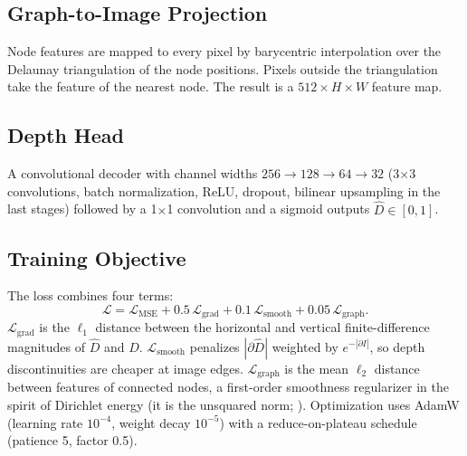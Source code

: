 \subsection{Graph-to-Image Projection}
Node features are mapped to every pixel by barycentric interpolation over the Delaunay triangulation of the node positions. Pixels outside the triangulation take the feature of the nearest node. The result is a $512\times H\times W$ feature map.

\subsection{Depth Head}
A convolutional decoder with channel widths $256\!\rightarrow\!128\!\rightarrow\!64\!\rightarrow\!32$ (3$\times$3 convolutions, batch normalization, ReLU, dropout, bilinear upsampling in the last stages) followed by a 1$\times$1 convolution and a sigmoid outputs $\hat{D}\in[0,1]$.

\subsection{Training Objective}
The loss combines four terms:
\begin{equation}
  \mathcal{L} = \mathcal{L}_{\mathrm{MSE}} + 0.5\,\mathcal{L}_{\mathrm{grad}} + 0.1\,\mathcal{L}_{\mathrm{smooth}} + 0.05\,\mathcal{L}_{\mathrm{graph}}.
\end{equation}
$\mathcal{L}_{\mathrm{grad}}$ is the $\ell_1$ distance between the horizontal and vertical finite-difference magnitudes of $\hat{D}$ and $D$.
$\mathcal{L}_{\mathrm{smooth}}$ penalizes $|\partial \hat{D}|$ weighted by $e^{-|\partial I|}$, so depth discontinuities are cheaper at image edges.
$\mathcal{L}_{\mathrm{graph}}$ is the mean $\ell_2$ distance between features of connected nodes, a first-order smoothness regularizer in the spirit of Dirichlet energy (it is the unsquared norm; ).
Optimization uses AdamW (learning rate $10^{-4}$, weight decay $10^{-5}$) with a reduce-on-plateau schedule (patience 5, factor 0.5).
